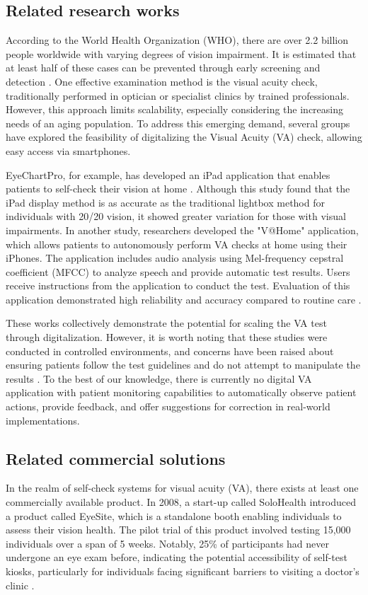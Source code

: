 \documentclass{article}
\begin{document}
\subsection{Related research works}
According to the World Health Organization (WHO), there are over 2.2 billion people worldwide with varying degrees of vision impairment. It is estimated that at least half of these cases can be prevented through early screening and detection \cite{who_blindness}. One effective examination method is the visual acuity check, traditionally performed in optician or specialist clinics by trained professionals. However, this approach limits scalability, especially considering the increasing needs of an aging population. To address this emerging demand, several groups have explored the feasibility of digitalizing the Visual Acuity (VA) check, allowing easy access via smartphones.

EyeChartPro, for example, has developed an iPad application that enables patients to self-check their vision at home \cite{zhang2023pilot}. Although this study found that the iPad display method is as accurate as the traditional lightbox method for individuals with 20/20 vision, it showed greater variation for those with visual impairments. In another study, researchers developed the "V@Home" application, which allows patients to autonomously perform VA checks at home using their iPhones. The application includes audio analysis using Mel-frequency cepstral coefficient (MFCC) to analyze speech and provide automatic test results. Users receive instructions from the application to conduct the test. Evaluation of this application demonstrated high reliability and accuracy compared to routine care \cite{han2019development}.

These works collectively demonstrate the potential for scaling the VA test through digitalization. However, it is worth noting that these studies were conducted in controlled environments, and concerns have been raised about ensuring patients follow the test guidelines and do not attempt to manipulate the results \cite{zhang2023pilot}. To the best of our knowledge, there is currently no digital VA application with patient monitoring capabilities to automatically observe patient actions, provide feedback, and offer suggestions for correction in real-world implementations.

\subsection{Related commercial solutions}
In the realm of self-check systems for visual acuity (VA), there exists at least one commercially available product. In 2008, a start-up called SoloHealth introduced a product called EyeSite, which is a standalone booth enabling individuals to assess their vision health. The pilot trial of this product involved testing 15,000 individuals over a span of 5 weeks. Notably, 25\% of participants had never undergone an eye exam before, indicating the potential accessibility of self-test kiosks, particularly for individuals facing significant barriers to visiting a doctor's clinic \cite{uspharmacist_website}. 
\end{document}
